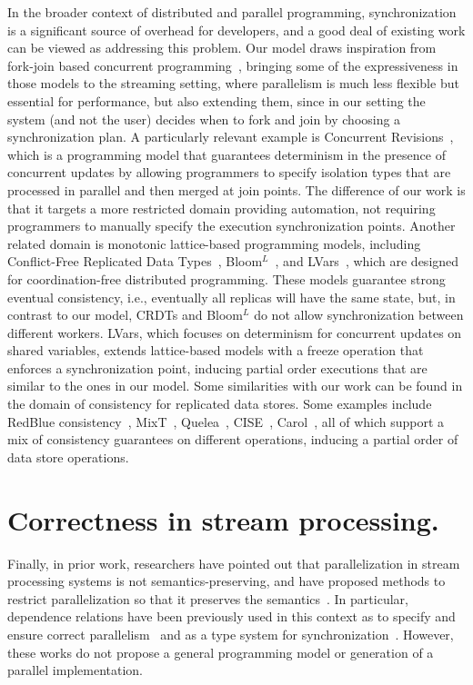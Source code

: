 In the broader context of distributed and parallel programming,
synchronization is a significant source of overhead for developers,
and a good deal of existing work can be viewed as addressing this problem.
Our model draws inspiration from fork-join based
concurrent programming~\cite{frigo1998implementation,lea2000java},
  bringing some of the expressiveness in those models to the streaming setting,
  where parallelism is much less flexible but essential for performance,
  but also extending them, since in our setting the system (and not the user) decides when to fork and join by choosing a synchronization plan.
%
A particularly relevant example is
Concurrent Revisions~\cite{burckhardt2010concurrent},
which is a programming model that guarantees determinism in the presence of concurrent updates by allowing programmers to specify isolation types that are processed in parallel and then merged at join points.
The difference of our work is that it targets a more restricted domain providing automation,
not requiring programmers to manually specify the execution synchronization points.
Another related domain is monotonic lattice-based programming models,
including
Conflict-Free Replicated Data Types~\cite{shapiro2011conflict},
Bloom$^L$~\cite{conway12},
and LVars~\cite{lvars13,lvars14},
which are designed for coordination-free distributed programming.
These models guarantee strong eventual consistency,
i.e., eventually all replicas will have the same state,
but, in contrast to our model, CRDTs and Bloom$^L$
do not allow synchronization between different workers.
LVars, which focuses on determinism for concurrent updates on shared variables,
extends lattice-based models with a freeze operation that enforces a synchronization point,
inducing partial order executions that are similar to the ones in our model.
Some similarities with our work can be found in the domain of consistency for replicated data stores.
Some examples include RedBlue consistency~\cite{li2012making},
MixT~\cite{milano2018mixt},
Quelea~\cite{sivaramakrishnan2015declarative},
CISE~\cite{gotsman16},
Carol~\cite{lewchenko2019sequential},
all of which support a mix of consistency guarantees on different operations,
inducing a partial order of data store operations.

\section{Correctness in stream processing.}

Finally, in prior work,
researchers have pointed out that
parallelization in stream processing systems is not
semantics-preserving, and have proposed methods to restrict
parallelization so that it preserves the
semantics~\cite{schneider2015safeparallelism, mamouras2019data}.
In particular, dependence relations have been previously used in this context
as to specify and ensure correct parallelism~\cite{mamouras2019data,2020:DifferentialTesting:OOPSLA}
and as a type system for synchronization~\cite{alur2021synchronization}.
However, these works do not propose a general programming model
or generation of a parallel implementation.


